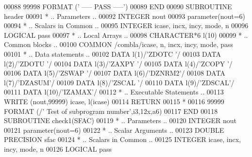 \begin{DoxyCode}
00088 99998 \textcolor{keyword}{FORMAT} (\textcolor{stringliteral}{'                                    ----- PASS -----'})
00089 \textcolor{keyword}{      END}
00090 \textcolor{keyword}{      SUBROUTINE }header
00091 \textcolor{comment}{*     .. Parameters ..}
00092       \textcolor{keywordtype}{INTEGER}          nout
00093       parameter(nout=6)
00094 \textcolor{comment}{*     .. Scalars in Common ..}
00095       \textcolor{keywordtype}{INTEGER}          icase, incx, incy, mode, n
00096       \textcolor{keywordtype}{LOGICAL}          pass
00097 \textcolor{comment}{*     .. Local Arrays ..}
00098       \textcolor{keywordtype}{CHARACTER*6}      l(10)
00099 \textcolor{comment}{*     .. Common blocks ..}
00100       \textcolor{keyword}{COMMON}           /combla/icase, n, incx, incy, mode, pass
00101 \textcolor{comment}{*     .. Data statements ..}
00102       \textcolor{keyword}{DATA}             l(1)/\textcolor{stringliteral}{'ZDOTC '}/
00103       \textcolor{keyword}{DATA}             l(2)/\textcolor{stringliteral}{'ZDOTU '}/
00104       \textcolor{keyword}{DATA}             l(3)/\textcolor{stringliteral}{'ZAXPY '}/
00105       \textcolor{keyword}{DATA}             l(4)/\textcolor{stringliteral}{'ZCOPY '}/
00106       \textcolor{keyword}{DATA}             l(5)/\textcolor{stringliteral}{'ZSWAP '}/
00107       \textcolor{keyword}{DATA}             l(6)/\textcolor{stringliteral}{'DZNRM2'}/
00108       \textcolor{keyword}{DATA}             l(7)/\textcolor{stringliteral}{'DZASUM'}/
00109       \textcolor{keyword}{DATA}             l(8)/\textcolor{stringliteral}{'ZSCAL '}/
00110       \textcolor{keyword}{DATA}             l(9)/\textcolor{stringliteral}{'ZDSCAL'}/
00111       \textcolor{keyword}{DATA}             l(10)/\textcolor{stringliteral}{'IZAMAX'}/
00112 \textcolor{comment}{*     .. Executable Statements ..}
00113       \textcolor{keyword}{WRITE} (nout,99999) icase, l(icase)
00114       \textcolor{keywordflow}{RETURN}
00115 \textcolor{comment}{*}
00116 99999 \textcolor{keyword}{FORMAT} (/\textcolor{stringliteral}{' Test of subprogram number'},i3,12x,a6)
00117 \textcolor{keyword}{      END}
00118 \textcolor{keyword}{      SUBROUTINE }check1(SFAC)
00119 \textcolor{comment}{*     .. Parameters ..}
00120       \textcolor{keywordtype}{INTEGER}           nout
00121       parameter(nout=6)
00122 \textcolor{comment}{*     .. Scalar Arguments ..}
00123       \textcolor{keywordtype}{DOUBLE PRECISION}  sfac
00124 \textcolor{comment}{*     .. Scalars in Common ..}
00125       \textcolor{keywordtype}{INTEGER}           icase, incx, incy, mode, n
00126       \textcolor{keywordtype}{LOGICAL}           pass

\end{DoxyCode}
